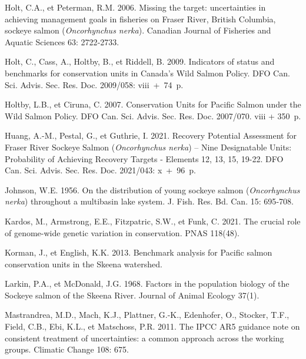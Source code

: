 \documentclass[french,11pt]{book}
\begin{document}
\begin{CSLReferences}{1}{0}
Holt, C.A., et Peterman, R.M. 2006. {Missing the target: uncertainties in achieving management goals in fisheries on Fraser River, British Columbia, sockeye salmon (}\emph{Oncorhynchus nerka}{)}. {Canadian Journal of Fisheries and Aquatic Sciences} 63: 2722‑2733.

Holt, C., Cass, A., Holtby, B., et Riddell, B. 2009. Indicators of status and benchmarks for conservation units in Canada's Wild Salmon Policy. {DFO Can. Sci. Advis. Sec. Res. Doc. 2009/058}: viii~+~74~p.

Holtby, L.B., et Ciruna, C. 2007. Conservation Units for Pacific Salmon under the Wild Salmon Policy. DFO Can. Sci. Advis. Sec. Res. Doc. 2007/070. viii + 350~p.

Huang, A.-M., Pestal, G., et Guthrie, I. 2021. {Recovery Potential Assessment for Fraser River Sockeye Salmon (}\emph{Oncorhynchus nerka}{) -- Nine Designatable Units: Probability of Achieving Recovery Targets - Elements 12, 13, 15, 19-22.} {DFO Can. Sci. Advis. Sec. Res. Doc.} 2021/043: x~+~96~p.

Johnson, W.E. 1956. {On the distribution of young sockeye salmon (}\emph{Oncorhynchus nerka}{) throughout a multibasin lake system}. J. Fish. Res. Bd. Can. 15: 695‑708.

Kardos, M., Armstrong, E.E., Fitzpatric, S.W., et Funk, C. 2021. {The crucial role of genome-wide genetic variation in conservation}. {PNAS} 118(48).

Korman, J., et English, K.K. 2013. {Benchmark analysis for Pacific salmon conservation units in the Skeena watershed}.

Larkin, P.A., et McDonald, J.G. 1968. {Factors in the population biology of the Sockeye salmon of the Skeena River}. {Journal of Animal Ecology} 37(1).

Mastrandrea, M.D., Mach, K.J., Plattner, G.-K., Edenhofer, O., Stocker, T.F., Field, C.B., Ebi, K.L., et Matschoss, P.R. 2011. {The IPCC AR5 guidance note on consistent treatment of uncertainties: a common approach across the working groups}. Climatic Change 108: 675.


\end{CSLReferences}
\end{document}
